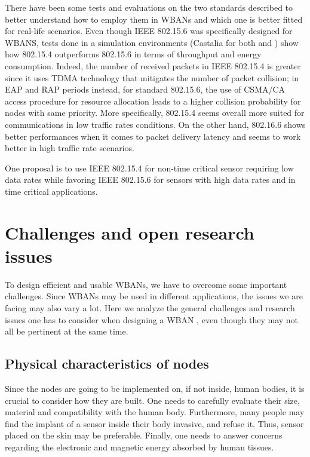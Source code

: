 \documentclass[conference]{IEEEtran}
\begin{document}
There have been some tests and evaluations on the two standards described to better understand how to employ them in WBANs and which one is better fitted for real-life scenarios. Even though IEEE 802.15.6 was specifically designed for WBANS, tests done in a simulation environments (Castalia for both \cite{nabila2019qos} and \cite{toumanari2014performance}) show how 802.15.4 outperforms 802.15.6 in terms of throughput and energy consumption. Indeed, the number of received packets in IEEE 802.15.4 is greater since it uses TDMA technology that mitigates the number of packet collision; in EAP and RAP periods instead, for standard 802.15.6, the use of CSMA/CA access procedure for resource allocation leads to a higher collision probability for nodes with same priority. More specifically, 802.15.4 seems overall more suited for communications in low traffic rates conditions. On the other hand, 802.16.6 shows better performances when it comes to packet delivery latency and seems to work better in high traffic rate scenarios.

One proposal \cite{nabila2019qos} is to use IEEE 802.15.4 for non-time critical sensor requiring low data rates while favoring IEEE 802.15.6 for sensors with high data rates and in time critical applications. 

\section{Challenges and open research issues}
To design efficient and usable WBANs, we have to overcome some important challenges. Since WBANs may be used in different applications, the issues we are facing may also vary a lot. Here we analyze the general challenges and research issues one has to consider when designing a WBAN \cite{cao2009enabling}, even though they may not all be pertinent at the same time.

\subsection {Physical characteristics of nodes}
Since the nodes are going to be implemented on, if not inside, human bodies, it is crucial to consider how they are built. One needs to carefully evaluate their size, material and compatibility with the human body. Furthermore, many people may find the implant of a sensor inside their body invasive, and refuse it. Thus, sensor placed on the skin may be preferable. Finally, one needs to answer concerns regarding the electronic and magnetic energy absorbed by human tissues.
\end{document}

